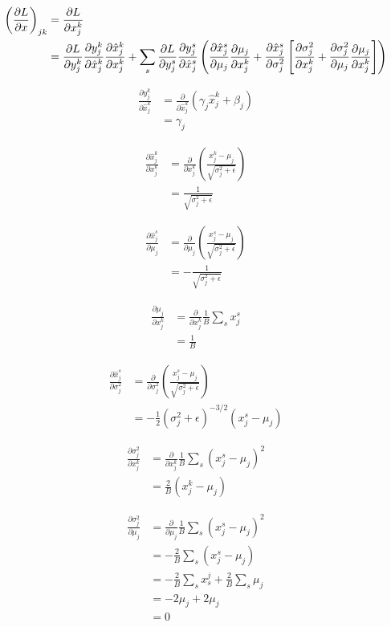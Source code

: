 \documentclass{article}
\newcommand{\pd}[2]{\frac{\partial #1}{\partial #2}}
\begin{document}
\begin{align}
\left(\pd{L}{x}\right)_{jk} &= \pd{L}{x_j^k} \notag \\
&= \pd{L}{y_j^k}\pd{y_j^k}{\hat{x}_j^k}\pd{\hat{x}_j^k}{x_j^k} + \sum_s \pd{L}{y_j^s}\pd{y_j^s}{\hat{x}_j^s}\left(\pd{\hat{x}_j^s}{\mu_j}\pd{\mu_j}{x_j^k} + \pd{\hat{x}_j^s}{\sigma_j^2}\left[\pd{\sigma_j^2}{x_j^k} + \pd{\sigma_j^2}{\mu_j}\pd{\mu_j}{x_j^k} \right] \right) \label{eq:dldx}
\end{align}

\begin{align*}
\pd{y_j^k}{\hat{x}_j^k} &= \pd{}{\hat{x}_j^k}(\gamma_j\hat{x}_j^k + \beta_j) \\
&= \gamma_j
\end{align*}

\begin{align*}
\pd{\hat{x}_j^k}{x_j^k} &= \pd{}{x_j^k}\left(\frac{x_j^k - \mu_j}{\sqrt{\sigma_j^2+\epsilon}}\right) \\
&=
\frac{1}{\sqrt{\sigma_j^2 + \epsilon}}
\end{align*}

\begin{align*}
\pd{\hat{x}_j^s}{\mu_j} &= \pd{}{\mu_j}\left(\frac{x_j^s - \mu_j}{\sqrt{\sigma_j^2+\epsilon}}\right)\\
&=
-\frac{1}{\sqrt{\sigma_j^2 + \epsilon}}
\end{align*}

\begin{align*}
\pd{\mu_j}{x_j^k} &= \pd{}{x_j^k}\frac{1}{B}\sum_s x_j^s \\
&= \frac{1}{B}
\end{align*}

\begin{align*}
\pd{\hat{x}_j^s}{\sigma_j^2} &=
\pd{}{\sigma_j^2}\left(\frac{x_j^s - \mu_j}{\sqrt{\sigma_j^2+\epsilon}}\right) \\
&=
-\frac{1}{2}(\sigma_j^2 + \epsilon)^{-3/2}(x_j^s - \mu_j)
\end{align*}

\begin{align*}
\pd{\sigma_j^2}{x_j^k} &= \pd{}{x_j^k}\frac{1}{B}\sum_s (x_j^s - \mu_j)^2\\
&=
\frac{2}{B}(x_j^k - \mu_j)
\end{align*}

\begin{align*}
\pd{\sigma^2_j}{\mu_j} &= \pd{}{\mu_j}\frac{1}{B}\sum_s (x_j^s - \mu_j)^2\\
&=
-\frac{2}{B}\sum_s(x_j^s - \mu_j) \\
&=
-\frac{2}{B}\sum_s x_s^j + \frac{2}{B}\sum_s \mu_j \\
&=
-2\mu_j + 2\mu_j \\
&= 0
\end{align*}
\end{document}
